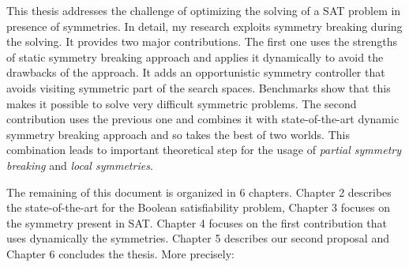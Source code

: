 %
%
%
This thesis addresses the challenge of optimizing the solving of a SAT problem in presence of
symmetries. In detail, my research exploits symmetry breaking during the solving.
It provides two major contributions. The first one uses the strengths of static symmetry 
breaking approach and applies it dynamically to avoid the drawbacks of the approach. 
It adds an opportunistic symmetry controller that avoids visiting symmetric part of the search spaces.
 Benchmarks show that this makes it possible to solve very difficult symmetric problems.
The second contribution uses the previous one and combines it with state-of-the-art dynamic 
symmetry breaking approach and so takes the best of two worlds. This combination leads to 
important theoretical step for the usage of \emph{partial symmetry breaking} and \emph{local symmetries}. 
 
The remaining of this document is organized in 6 chapters. Chapter 2 describes the state-of-the-art
 for the Boolean satisfiability problem, Chapter 3 focuses on the symmetry present in SAT.
Chapter 4 focuses on the first contribution that uses dynamically the symmetries.
Chapter 5 describes our second proposal and Chapter 6 concludes the thesis. More precisely:
 
